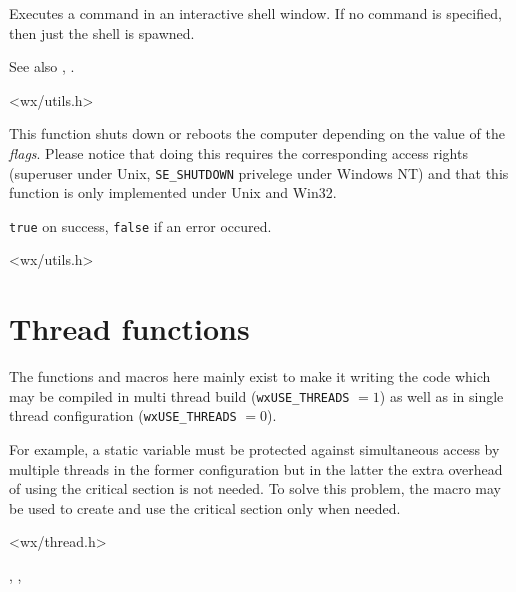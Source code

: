 Executes a command in an interactive shell window. If no command is
specified, then just the shell is spawned.

See also , .


<wx/utils.h>


\label{wxshutdown}


This function shuts down or reboots the computer depending on the value of the
{\it flags}. Please notice that doing this requires the corresponding access
rights (superuser under Unix, {\tt SE\_SHUTDOWN} privelege under Windows NT)
and that this function is only implemented under Unix and Win32.




{\tt true} on success, {\tt false} if an error occured.


<wx/utils.h>



\section{Thread functions}\label{threadfunctions}

The functions and macros here mainly exist to make it writing the code which
may be compiled in multi thread build ({\tt wxUSE\_THREADS} $= 1$) as well as
in single thread configuration ({\tt wxUSE\_THREADS} $= 0$).

For example, a static variable must be protected against simultaneous access by
multiple threads in the former configuration but in the latter the extra
overhead of using the critical section is not needed. To solve this problem,
the  macro may be used
to create and use the critical section only when needed.


<wx/thread.h>


, , 



